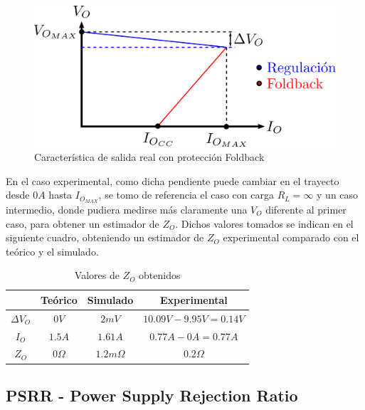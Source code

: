 \begin{figure}[!ht]
\begin{centering}
\includegraphics[scale=0.5]{Imagenes/FB_Real.png}
\par\end{centering}
\caption{Caracter\'istica de salida real con protecci\'on Foldback}

\end{figure}

En el caso experimental, como dicha pendiente puede cambiar en el trayecto desde $0A$ hasta $I_{O_{MAX}}$, se tomo de referencia el caso con carga $R_L = \infty$ y un caso intermedio, donde pudiera medirse m\'as claramente una $V_O$ diferente al primer caso, para obtener un estimador de $Z_O$. Dichos valores tomados se indican en el siguiente cuadro, obteniendo un estimador de $Z_O$ experimental comparado con el te\'orico y el simulado.


\begin{table}[!ht]

\begin{center}
\begin{tabular}{|c||c|c|c|}
\hline
& Te\'orico & Simulado & Experimental\\
\hline 
$\Delta V_O$ & $0V$ & $2mV$ & $10.09V-9.95V=0.14V$\\
\hline 
$I_O$ &  $1.5A$    &   $1.61A$     & $0.77A - 0A = 0.77A$\\
\hline
$Z_O$ &   $0\Omega$   &    $1.2m\Omega$    & $0.2\Omega$\\
\hline
\end{tabular}
\end{center}

\caption{Valores de $Z_O$ obtenidos}
\end{table}


\subsection{PSRR - Power Supply Rejection Ratio}


